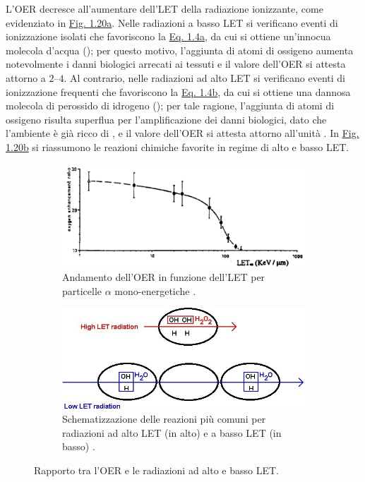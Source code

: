\documentclass[12pt,a4paper,twoside]{report}
\begin{document}
	L'OER decresce all'aumentare dell'LET della radiazione ionizzante, come evidenziato in \hyperref[fig:let_oer]{Fig. 1.20a}. Nelle radiazioni a basso LET si verificano eventi di ionizzazione isolati che favoriscono la \hyperref[eq:prodotto1]{Eq. 1.4a}, da cui si ottiene un'innocua molecola d'acqua (); per questo motivo, l'aggiunta di atomi di ossigeno aumenta notevolmente i danni biologici arrecati ai tessuti e il valore dell'OER si attesta attorno a $2$--$4$. Al contrario, nelle radiazioni ad alto LET si verificano eventi di ionizzazione frequenti che favoriscono la \hyperref[eq:prodotto2]{Eq. 1.4b}, da cui si ottiene una dannosa molecola di perossido di idrogeno (); per tale ragione, l'aggiunta di atomi di ossigeno risulta superflua per l'amplificazione dei danni biologici, dato che l'ambiente è già ricco di , e il valore dell'OER si attesta attorno all'unità \cite{BRAHME2014121,Barendsen1994-bx}. In \hyperref[fig:reaction_let]{Fig. 1.20b} si riassumono le reazioni chimiche favorite in regime di alto e basso LET.
	\begin{figure}[H]
		\centering
		\begin{subfigure}[t]{0.49\textwidth}
			\centering
			\includegraphics[width=\textwidth, scale=0.50]{let_rbe2.png}
			\caption{Andamento dell'OER in funzione dell'LET per particelle $\alpha$ mono-energetiche \cite{antib1020124,handbook1}.}
			\label{fig:let_oer}
		\end{subfigure}
		\hfill
		\begin{subfigure}[t]{0.49\textwidth}
			\centering
			\includegraphics[width=\textwidth, scale=0.50]{reaction_let.jpg}
			\caption{Schematizzazione delle reazioni più comuni per radiazioni ad alto LET (in alto) e a basso LET (in basso) \cite{let_si}.}
			\label{fig:reaction_let}
		\end{subfigure}
		\caption{Rapporto tra l'OER e le radiazioni ad alto e basso LET.}
	\end{figure}
\end{document}
